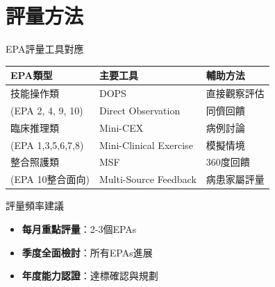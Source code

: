 \documentclass[aspectratio=169]{beamer}
\begin{document}
\section{評量方法}

\begin{frame}{EPA評量工具對應}
\begin{table}
\centering
\footnotesize
\begin{tabular}{|l|l|l|}
\hline
\rowcolor{emergency_blue!20}
\textbf{EPA類型} & \textbf{主要工具} & \textbf{輔助方法} \\
\hline
技能操作類 & DOPS & 直接觀察評估 \\
(EPA 2, 4, 9, 10) & \scriptsize Direct Observation & 同儕回饋 \\
\hline
臨床推理類 & Mini-CEX & 病例討論 \\
(EPA 1,3,5,6,7,8) & \scriptsize Mini-Clinical Exercise & 模擬情境 \\
\hline
整合照護類 & MSF & 360度回饋 \\
(EPA 10整合面向) & \scriptsize Multi-Source Feedback & 病患家屬評量 \\
\hline
\end{tabular}
\end{table}

\vspace{0.5cm}

\begin{block}{評量頻率建議}
\begin{itemize}
\item \textbf{每月重點評量}：2-3個EPAs
\item \textbf{季度全面檢討}：所有EPAs進展
\item \textbf{年度能力認證}：達標確認與規劃
\end{itemize}
\end{block}
\end{frame}
\end{document}
